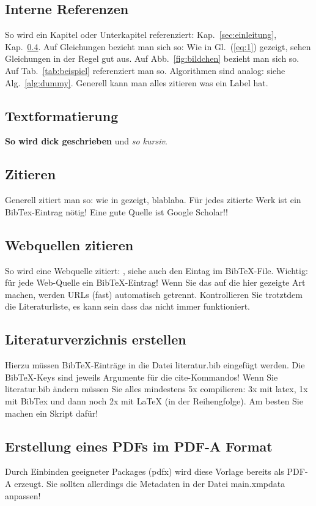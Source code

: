 \documentclass[12pt,oneside]{article}
\begin{document}
\subsection{Interne Referenzen}
So wird ein Kapitel oder Unterkapitel referenziert: Kap.~\ref{sec:einleitung},
Kap.~\ref{sec:webquellen}. Auf Gleichungen bezieht man sich so: Wie in Gl.~(\ref{eq:1}) gezeigt,
sehen Gleichungen in der Regel gut aus. Auf Abb.~\ref{fig:bildchen} bezieht man sich so. Auf
Tab.~\ref{tab:beispiel} referenziert man so. Algorithmen sind analog: siehe Alg.~\ref{alg:dummy}.
Generell kann man alles zitieren was ein Label hat.

\subsection{Textformatierung}
\textbf{So wird dick geschrieben} und \textit{so kursiv}.

\subsection{Zitieren}\label{sec:zitate}
Generell zitiert man so: wie in \cite{clemen1989combining} gezeigt, blablaba. Für jedes zitierte Werk ist ein BibTex-Eintrag nötig! Eine gute Quelle ist Google Scholar!!

\subsection{Webquellen zitieren}\label{sec:webquellen}
So wird eine Webquelle zitiert: \cite{shiny1}, siehe auch den Eintag im BibTeX-File.
Wichtig: für jede Web-Quelle ein BibTeX-Eintrag! Wenn Sie das auf die hier gezeigte Art machen, werden URLs (fast) automatisch getrennt. Kontrollieren Sie trotztdem die Literaturliste, es kann sein dass das nicht immer funktioniert.

\subsection{Literaturverzichnis erstellen}
Hierzu müssen BibTeX-Einträge in die Datei literatur.bib eingefügt werden. Die BibTeX-Keys sind jeweils Argumente für die cite-Kommandos! Wenn Sie literatur.bib ändern müssen Sie alles mindestens 5x compilieren: 3x mit latex, 1x mit BibTex und dann noch 2x mit LaTeX (in der Reihengfolge). Am besten Sie machen ein Skript dafür!

\subsection{Erstellung eines PDFs im PDF-A Format}
Durch Einbinden geeigneter Packages (pdfx) wird diese Vorlage bereits als PDF-A erzeugt. Sie sollten allerdings die Metadaten in der Datei main.xmpdata anpassen!

\clearpage






\end{document}
